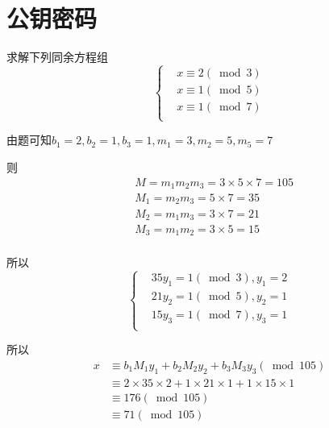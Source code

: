 \documentclass[UTF8]{ctexart}
\begin{document}
\section{公钥密码}
\begin{enumerate}[label={[}\arabic*{]}]
  \item 求解下列同余方程组
  $$
  \left\{ \begin{aligned}
    &x\equiv 2(\bmod 3)\\
    &x\equiv 1(\bmod 5)\\
    &x\equiv 1(\bmod 7)\\
  \end{aligned}\right.
  $$

  由题可知$b_1=2, b_2=1, b_3=1, m_1=3, m_2=5, m_5=7$

  则$$
  \begin{aligned}
    &M=m_1m_2m_3=3\times 5\times 7=105\\
    &M_1=m_2m_3=5\times 7=35\\
    &M_2=m_1m_3=3\times 7=21\\
    &M_3=m_1m_2=3\times 5=15\\
  \end{aligned}
  $$

  所以
  $$\left\{
    \begin{aligned}
      &35y_1=1(\bmod 3), y_1=2\\
      &21y_2=1(\bmod 5), y_2=1\\
      &15y_3=1(\bmod 7), y_3=1\\
    \end{aligned}
  \right.
  $$

  所以
  $$
  \begin{aligned}
    x&\equiv b_1M_1y_1+b_2M_2y_2+b_3M_3y_3(\bmod 105)\\
      &\equiv 2\times 35\times 2+1\times 21\times 1+1\times 15\times1\\
      &\equiv 176(\bmod 105)\\
      &\equiv 71(\bmod 105)
  \end{aligned}
  $$
\end{enumerate}
\end{document}
